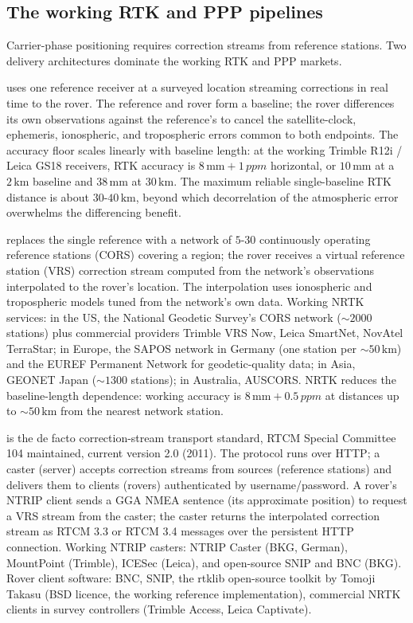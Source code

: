 \subsection{The working RTK and PPP pipelines}

Carrier-phase positioning requires correction streams from
reference stations. Two delivery architectures dominate the
working RTK and PPP markets.

 uses one reference receiver at a
surveyed location streaming corrections in real time to the rover.
The reference and rover form a baseline; the rover differences its
own observations against the reference's to cancel the
satellite-clock, ephemeris, ionospheric, and tropospheric errors
common to both endpoints. The accuracy floor scales linearly with
baseline length: at the working Trimble R12i / Leica GS18 receivers,
RTK accuracy is $8\,\si{\milli\meter} + 1\,\si{ppm}$ horizontal,
or $10\,\si{\milli\meter}$ at a $2\,\si{\kilo\meter}$ baseline and
$38\,\si{\milli\meter}$ at $30\,\si{\kilo\meter}$. The
maximum reliable single-baseline RTK distance is about $30$-$40
\,\si{\kilo\meter}$, beyond which decorrelation of the atmospheric
error overwhelms the differencing benefit.

 replaces the single reference with a
network of $5$-$30$ continuously operating reference stations
(CORS) covering a region; the rover receives a virtual reference
station (VRS) correction stream computed from the network's
observations interpolated to the rover's location. The interpolation
uses ionospheric and tropospheric models tuned from the network's
own data. Working NRTK services: in the US, the National Geodetic
Survey's CORS network ($\sim 2000$ stations) plus commercial
providers Trimble VRS Now, Leica SmartNet, NovAtel TerraStar; in
Europe, the SAPOS network in Germany (one station per $\sim
50\,\si{\kilo\meter}$) and the EUREF Permanent Network for
geodetic-quality data; in Asia, GEONET Japan ($\sim 1300$
stations); in Australia, AUSCORS. NRTK reduces the baseline-length
dependence: working accuracy is $8\,\si{\milli\meter} + 0.5\,
\si{ppm}$ at distances up to $\sim 50\,\si{\kilo\meter}$ from the
nearest network station.

 is the de facto correction-stream transport standard,
RTCM Special Committee 104 maintained, current version 2.0 (2011).
The protocol runs over HTTP; a caster (server) accepts correction
streams from sources (reference stations) and delivers them to
clients (rovers) authenticated by username/password. A rover's
NTRIP client sends a $\mathrm{GGA}$ NMEA sentence (its
approximate position) to request a VRS stream from the caster; the
caster returns the interpolated correction stream as RTCM 3.3 or
RTCM 3.4 messages over the persistent HTTP connection. Working
NTRIP casters: NTRIP Caster (BKG, German), MountPoint (Trimble),
ICESec (Leica), and open-source SNIP and BNC (BKG). Rover client
software: BNC, SNIP, the rtklib open-source toolkit by Tomoji
Takasu (BSD licence, the working reference implementation),
commercial NRTK clients in survey controllers (Trimble Access,
Leica Captivate).

